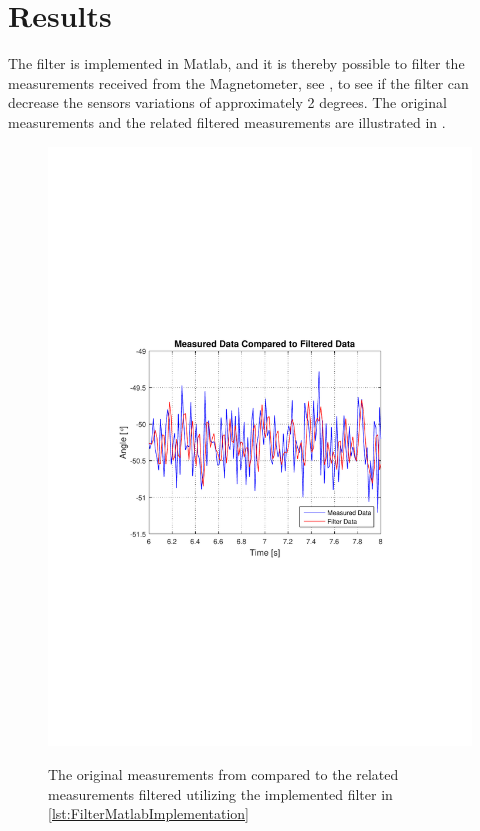 \section{Results}
The filter is implemented in Matlab, and it is thereby possible to filter the measurements received from the Magnetometer, see , to see if the filter can decrease the sensors variations of approximately 2 degrees. The original measurements and the related filtered measurements are illustrated in .
%
\begin{figure}[H]
  \centering
  {
    \includegraphics[width=1.2\textwidth]{figures/FinalImplementedFilter.pdf}
  }
  \caption{The original measurements from  compared to the related measurements filtered utilizing the implemented filter in \autoref{lst:FilterMatlabImplementation}}
  \label{fig:FinalImplementedFilter}
\end{figure}

